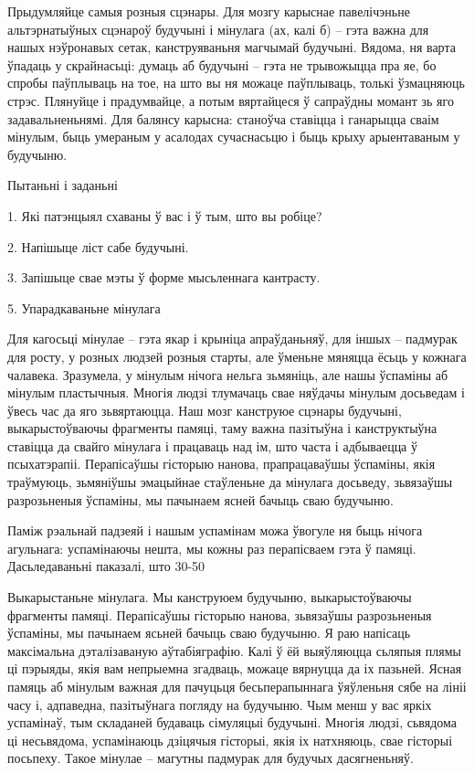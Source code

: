 Прыдумляйце самыя розныя сцэнары. Для мозгу карыснае павелічэньне альтэрнатыўных сцэнароў будучыні і мінулага (ах, калі б) – гэта важна для нашых нэўронавых сетак, канструяваньня магчымай будучыні. Вядома, ня варта ўпадаць у скрайнасьці: думаць аб будучыні – гэта не трывожыцца пра яе, бо спробы паўплываць на тое, на што вы ня можаце паўплываць, толькі ўзмацняюць стрэс. Плянуйце і прадумвайце, а потым вяртайцеся ў сапраўдны момант зь яго задавальненьнямі. Для балянсу карысна: станоўча ставіцца і ганарыцца сваім мінулым, быць умераным у асалодах сучаснасьцю і быць крыху арыентаваным у будучыню.

Пытаньні і заданьні

1. Які патэнцыял схаваны ў вас і ў тым, што вы робіце?

2. Напішыце ліст сабе будучыні.

3. Запішыце свае мэты ў форме мысьленнага кантрасту.


5. Упарадкаваньне мінулага

Для кагосьці мінулае – гэта якар і крыніца апраўданьняў, для іншых – падмурак для росту, у розных людзей розныя старты, але ўменьне мяняцца ёсьць у кожнага чалавека. Зразумела, у мінулым нічога нельга зьмяніць, але нашы ўспаміны аб мінулым пластычныя. Многія людзі тлумачаць свае няўдачы мінулым досьведам і ўвесь час да яго зьвяртаюцца. Наш мозг канструюе сцэнары будучыні, выкарыстоўваючы фрагменты памяці, таму важна пазітыўна і канструктыўна ставіцца да свайго мінулага і працаваць над ім, што часта і адбываецца ў псыхатэрапіі. Перапісаўшы гісторыю нанова, прапрацаваўшы ўспаміны, якія траўмуюць, зьмяніўшы эмацыйнае стаўленьне да мінулага досьведу, зьвязаўшы разрозьненыя ўспаміны, мы пачынаем ясней бачыць сваю будучыню.

Паміж рэальнай падзеяй і нашым успамінам можа ўвогуле ня быць нічога агульнага: успамінаючы нешта, мы кожны раз перапісваем гэта ў памяці. Дасьледаваньні паказалі, што 30-50%

Выкарыстаньне мінулага. Мы канструюем будучыню, выкарыстоўваючы фрагменты памяці. Перапісаўшы гісторыю нанова, зьвязаўшы разрозьненыя ўспаміны, мы пачынаем ясьней бачыць сваю будучыню. Я раю напісаць максімальна дэталізаваную аўтабіяграфію. Калі ў ёй выяўляюцца сьляпыя плямы ці пэрыяды, якія вам непрыемна згадваць, можаце вярнуцца да іх пазьней. Ясная памяць аб мінулым важная для пачуцьця бесьперапыннага ўяўленьня сябе на лініі часу і, адпаведна, пазітыўнага погляду на будучыню. Чым менш у вас яркіх успамінаў, тым складаней будаваць сімуляцыі будучыні. Многія людзі, сьвядома ці несьвядома, успамінаюць дзіцячыя гісторыі, якія іх натхняюць, свае гісторыі посьпеху. Такое мінулае – магутны падмурак для будучых дасягненьняў.

